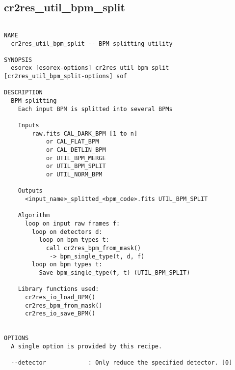 \subsection{cr2res\_util\_bpm\_split}
\begin{verbatim}

NAME
  cr2res_util_bpm_split -- BPM splitting utility

SYNOPSIS
  esorex [esorex-options] cr2res_util_bpm_split [cr2res_util_bpm_split-options] sof

DESCRIPTION
  BPM splitting                                                           
    Each input BPM is splitted into several BPMs                          
                                                                          
    Inputs                                                                
     	raw.fits CAL_DARK_BPM [1 to n]                   
            or CAL_FLAT_BPM                            
            or CAL_DETLIN_BPM                          
            or UTIL_BPM_MERGE                          
            or UTIL_BPM_SPLIT                          
            or UTIL_NORM_BPM                           
                                                                          
    Outputs                                                               
      <input_name>_splitted_<bpm_code>.fits UTIL_BPM_SPLIT
                                                                          
    Algorithm                                                             
      loop on input raw frames f:                                         
        loop on detectors d:                                              
          loop on bpm types t:                                            
            call cr2res_bpm_from_mask()                                   
             -> bpm_single_type(t, d, f)                                  
        loop on bpm types t:                                              
          Save bpm_single_type(f, t) (UTIL_BPM_SPLIT)                     
                                                                          
    Library functions used:                                               
      cr2res_io_load_BPM()                                                
      cr2res_bpm_from_mask()                                              
      cr2res_io_save_BPM()                                                
  

OPTIONS
  A single option is provided by this recipe.

  --detector            : Only reduce the specified detector. [0]

\end{verbatim}
